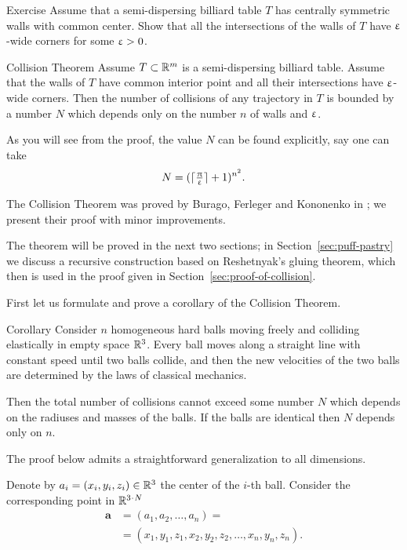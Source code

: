\begin{thm}{Exercise}\label{ex:centrally-simmetric-walls}
Assume that a semi-dispersing billiard table $T$ has
centrally symmetric walls with common center.
Show that all the intersections of the walls of $T$  have $\upvarepsilon$-wide corners for some $\upvarepsilon>0$.
\end{thm}

\begin{thm}{Collision Theorem}\label{thm:collision}
Assume $T\subset\RR^m$
is a semi-dispersing billiard table.
Assume that the walls of $T$ have common interior point 
and all their intersections have $\upvarepsilon$-wide corners.
Then the number of collisions of any trajectory in  $T$  is bounded
by a number $N$ which depends only on the number $n$ of walls and $\upvarepsilon$.
\end{thm}

As you will see from the proof,
the value $N$ can be found explicitly,
say one can take 
\[N=(\lceil\tfrac{\uppi}{\upvarepsilon}\rceil+1)^{n^2}.\]

The Collision Theorem was proved by Burago, Ferleger and Kononenko in \cite{BFK};
we present their proof with minor improvements.

The theorem will be proved in the next two sections;
in Section~\ref{sec:puff-pastry} we discuss a recursive construction based on Reshetnyak's gluing theorem,
which then is used in the proof given in Section~\ref{sec:proof-of-collision}.

First let us formulate and prove a corollary of the  Collision Theorem.

\begin{thm}{Corollary}\label{cor:balls}
Consider $n$ homogeneous hard balls
moving freely and colliding
elastically in empty space $\mathbb{R}^3$. 
Every ball moves
along a straight line with constant speed until two balls collide, and then
the new velocities of the two balls are determined by the
laws of classical mechanics.

Then the total number of collisions cannot exceed some number $N$ which depends on the radiuses and masses of the balls.
If the balls are identical then $N$ depends only on $n$.
\end{thm}

The proof below admits a straightforward generalization to all dimensions.

Denote by $a_i=(x_i,y_i,z_i) \in \RR^3$ the center of the $i$-th ball.
Consider the corresponding point in $\RR^{3\cdot N}$
\begin{align*}
\bm{a}&=(a_1, a_2 , \dots , a_n ) =
\\
&=(x_1, y_1 , z_1 , x_2 , y_2 , z_2 , \dots , x_n , y_n , z_n).
\end{align*}

